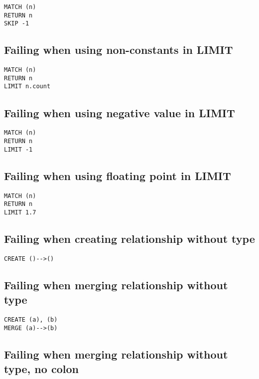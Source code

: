 \begin{lstlisting}
MATCH (n)
RETURN n
SKIP -1
\end{lstlisting}

\subsection{Failing when using non-constants in LIMIT}

\begin{lstlisting}
MATCH (n)
RETURN n
LIMIT n.count
\end{lstlisting}

\subsection{Failing when using negative value in LIMIT}

\begin{lstlisting}
MATCH (n)
RETURN n
LIMIT -1
\end{lstlisting}

\subsection{Failing when using floating point in LIMIT}

\begin{lstlisting}
MATCH (n)
RETURN n
LIMIT 1.7
\end{lstlisting}

\subsection{Failing when creating relationship without type}

\begin{lstlisting}
CREATE ()-->()
\end{lstlisting}

\subsection{Failing when merging relationship without type}

\begin{lstlisting}
CREATE (a), (b)
MERGE (a)-->(b)
\end{lstlisting}

\subsection{Failing when merging relationship without type, no colon}

